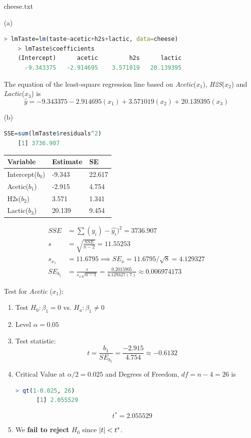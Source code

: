 \documentclass[boxes, qed]{homework}
\DeclarePairedDelimiter\abs{\lvert}{\rvert}%
\begin{document}
\begin{problem}cheese.txt
\end{problem}
\begin{solution}(a)
  \begin{lstlisting}[backgroundcolor = \color{lightgray},language = R]
    > lmTaste=lm(taste~acetic+h2s+lactic, data=cheese)
    > lmTaste$coefficients
    (Intercept)      acetic         h2s      lactic 
      -9.343375   -2.914695    3.571019   20.139395 
  \end{lstlisting}
  The equation of the least-square regression line based on 
  \textit{Acetic}($x_1$), \textit{H2S}($x_2$) and \textit{Lactic}($x_3$) is
  $$\hat{y}=-9.343375 - 2.914695(x_1) + 3.571019(x_2) + 20.139395(x_3)$$

  (b)
  \begin{lstlisting}[backgroundcolor = \color{lightgray},language = R]
    SSE=sum(lmTaste$residuals^2)
    [1] 3736.907
  \end{lstlisting}
  
  \begin{tabular}{l|l|l}\hline
    Variable & Estimate & SE\\\hline
    Intercept($b_0$) & -9.343 & 22.617\\
    Acetic($b_1$) & -2.915 & 4.754\\
    H2s($b_2$) & 3.571 & 1.341\\
    Lactic($b_3$) & 20.139 & 9.454
  \end{tabular}

  \begin{align*}
    SSE &= \sum(y_i)-\hat{y_i})^2 = 3736.907\\
    s &= \sqrt{\frac{SSE}{n-2}} = 11.55253\\
    s_{x_1} &= 11.6795 \implies SE_x=11.6795/\sqrt{8} = 4.129327\\
    SE_{b_1} &= \frac{s}{s_x\sqrt{n-1}}
    = \frac{0.2015905}{4.129327(7)}
    \approx 0.006974173
  \end{align*}
  
  Test for \textit{Acetic} ($x_1$):
  \begin{enumerate}
    \item Test $H_0: \beta_1=0$ vs. $H_a:\beta_1 \ne 0$
    \item Level $\alpha=0.05$
    \item Test statistic:
    $$
      t = \frac{b_1}{SE_{b_1}}
      = \frac{-2.915}{4.754}
      \approx -0.6132
    $$
    \item Critical Value at $\alpha/2=0.025$
    and Degrees of Freedom, $df=n-4=26$ is
    \begin{lstlisting}[backgroundcolor = \color{lightgray},language = R]
      > qt(1-0.025, 26)
      [1] 2.055529
    \end{lstlisting}
    $$t^*=2.055529$$
    \item We \textbf{fail to reject} $H_0$ since $\abs{t}<t^*$.
  \end{enumerate}
  

\end{solution}
\end{document}
